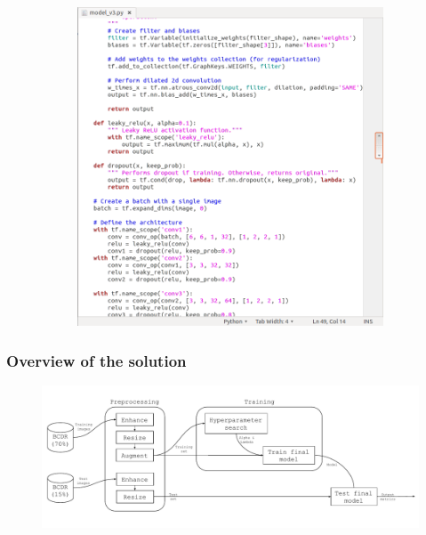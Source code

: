 \documentclass{beamer}
\begin{document}
\begin{frame}
\begin{figure}[h]
\begin{subfigure}{0.5\textwidth}
				\includegraphics[width=\textwidth]{plots/code.png}
			\end{subfigure}
		\end{figure}
	\end{frame}
	
	\begin{frame}
	\frametitle{Overview of the solution}
		\begin{figure}[ht]
			\centering
			\includegraphics[width=\textwidth]{plots/overview.pdf}
		\end{figure}
	\end{frame}
	
\end{document}
